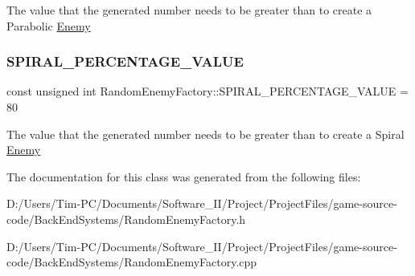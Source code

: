 The value that the generated number needs to be greater than to create a Parabolic \hyperlink{class_enemy}{Enemy} \mbox{\label{class_random_enemy_factory_ac912e49add9d56e8b12d3881ce1cc656}} 
\subsubsection{\texorpdfstring{S\+P\+I\+R\+A\+L\+\_\+\+P\+E\+R\+C\+E\+N\+T\+A\+G\+E\+\_\+\+V\+A\+L\+UE}{SPIRAL\_PERCENTAGE\_VALUE}}
{\footnotesize\ttfamily const unsigned int Random\+Enemy\+Factory\+::\+S\+P\+I\+R\+A\+L\+\_\+\+P\+E\+R\+C\+E\+N\+T\+A\+G\+E\+\_\+\+V\+A\+L\+UE = 80\hspace{0.3cm}{\ttfamily [private]}}

The value that the generated number needs to be greater than to create a Spiral \hyperlink{class_enemy}{Enemy} 

The documentation for this class was generated from the following files\+:\begin{DoxyCompactItemize}
\item 
D\+:/\+Users/\+Tim-\/\+P\+C/\+Documents/\+Software\+\_\+\+I\+I/\+Project/\+Project\+Files/game-\/source-\/code/\+Back\+End\+Systems/Random\+Enemy\+Factory.\+h\item 
D\+:/\+Users/\+Tim-\/\+P\+C/\+Documents/\+Software\+\_\+\+I\+I/\+Project/\+Project\+Files/game-\/source-\/code/\+Back\+End\+Systems/Random\+Enemy\+Factory.\+cpp\end{DoxyCompactItemize}

